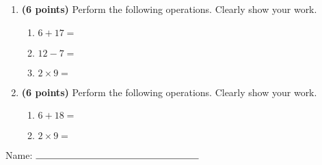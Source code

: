 \documentclass[12pt]{amsart}
\begin{document}
\newpage
\begin{enumerate}
\item {\bf (6 points)} 
 Perform the following operations. Clearly show your work. \begin{enumerate}


\def \a{6}\def \b{17}\def \apb{23}

 
\item $\a + \b = $

\vspace{2cm}
\def \a{12}\def \dif{5}\def \b{7}

 
\item $\a - \b = $

\vspace{2cm}
\def \a{2}\def \b{9}\def \ab{11}

 
\item $\a \times \b = $ 

\vspace{2cm}
\def \vshift{1}\def \hshift{-4}\def \chang{-1}\def \findval{-5}\def \yval{3}

 
\end{enumerate}


\newpage
\item {\bf (6 points)} 
 Perform the following operations. Clearly show your work. \begin{enumerate}


\def \a{6}\def \b{18}\def \apb{24}

 
\item $\a + \b = $

\vspace{2cm}
\def \a{2}\def \b{9}\def \ab{11}

 
\item $\a \times \b = $ 

\vspace{2cm}
\def \vshift{-1}\def \hshift{-4}\def \chang{2}\def \findval{-2}\def \yval{-5}

 
\end{enumerate}


\newpage\end{enumerate}\graphicspath{{C:/Users/iainc/anaconda3/Randomizer/Sample Course/Sample Assessment 2/}}\setcounter{page}{1}


\thispagestyle{fancy}

 
\noindent Name: $\rule{6cm}{0.15mm}$

\vspace{.2cm}
\end{document}
